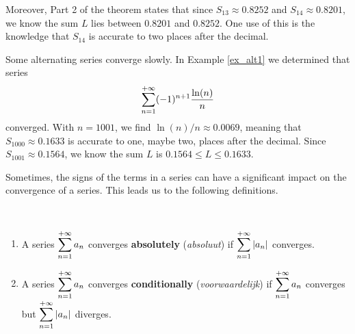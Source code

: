 Moreover, Part 2 of the theorem states that since $S_{13} \approx 0.8252$ and $S_{14}\approx 0.8201$, we know the sum $L$ lies between $0.8201$ and $0.8252$. One use of this is the knowledge that $S_{14}$ is accurate to two places after the decimal.

Some alternating series converge slowly. In Example \ref{ex_alt1} we determined that  series $$\displaystyle\sum_{n=1}^{+\infty} (-1)^{n+1}\frac{\ln(n)}{n}$$ converged. With $n=1001$, we find $\ln(n)/n \approx 0.0069$, meaning that $S_{1000} \approx 0.1633$ is accurate to one, maybe two, places after the decimal. Since $S_{1001} \approx 0.1564$, we know the sum $L$ is $0.1564\leq L\leq0.1633$.


Sometimes, the signs of the terms in a series can have a significant impact on the convergence of a series. This leads us to the following definitions. 

\begin{definition} \label{def:abs_converge}
{\footnotesize $\,$}\\
\vspace*{-1.25cm}
\begin{enumerate}
	\item  A series $\displaystyle \sum_{n=1}^{+\infty} a_n$ converges \textbf{absolutely} (\textit{absoluut}) if $\displaystyle \sum_{n=1}^{+\infty} |a_n|$ converges.
	\item A series $\displaystyle \sum_{n=1}^{+\infty} a_n$ converges \textbf{conditionally} (\textit{voorwaardelijk}) if $\displaystyle \sum_{n=1}^{+\infty} a_n$ converges but $\displaystyle \sum_{n=1}^{+\infty} |a_n|$ diverges.
\end{enumerate}
\end{definition}

